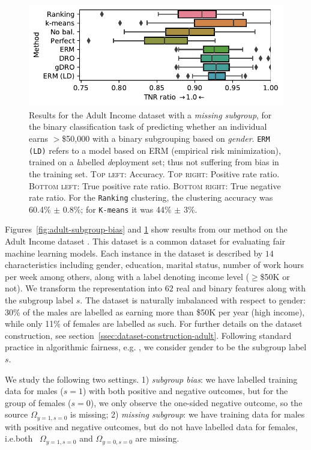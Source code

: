 \begin{figure}[p]
    \includegraphics[width=\columnwidth]{paper3/figures/adult_miss_s_tnrr.pdf}
    \caption{%
    Results for the Adult Income dataset with a \emph{missing subgroup},
    for the binary classification task of predicting whether an individual earns $>$\$50,000 with a binary subgrouping based on \emph{gender}.
    \texttt{ERM (LD)} refers to a model based on ERM (empirical risk minimization),
    trained on a \emph{l}abelled \emph{d}eployment set; thus not suffering from bias in the training set.
    \textsc{Top left}: Accuracy.
    \textsc{Top right}: Positive rate ratio.
    \textsc{Bottom left}: True positive rate ratio.
    \textsc{Bottom right}: True negative rate ratio.
    For the \texttt{Ranking} clustering, the clustering accuracy was 60.4\% $\pm$ 0.8\%;
    for \texttt{K-means} it was 44\% $\pm$ 3\%.
    }%
    \label{fig:adult-missing-subgroup}
\end{figure}
Figures~\ref{fig:adult-subgroup-bias} and \ref{fig:adult-missing-subgroup} show results from our method on the Adult Income dataset \cite{Dua:2017}.
This dataset is a common dataset for evaluating fair machine learning models. 
Each instance in the dataset is described by $14$ characteristics including gender, education, marital status, number of work hours per week among others, along with a label denoting income level ($\geq$\$50K or not). 
We transform the representation into $62$ real and binary features along with the subgroup label $s$. %
The dataset is naturally imbalanced with respect to gender: 30\% of the males are labelled as earning more than \$50K per year (high income), while only 11\% of females are labelled as such.
For further details on the dataset construction, see section~\ref{ssec:dataset-construction-adult}.
%
Following standard practice in algorithmic fairness, e.g. \citet{zemel2013learning}, we consider gender to be the subgroup label $s$.

We study the following two settings.
1) \emph{subgroup bias}: we have labelled training data for males ($s=1$) with both positive and negative outcomes, but for the group of females ($s=0$), we only observe the one-sided negative outcome, so the source $\Omega_{y=1,s=0}$ is missing;
2) \emph{missing subgroup}: we have training data for males with positive and negative outcomes, but do not have labelled data for females, i.e.both \ $\Omega_{y=1,s=0}$ and $\Omega_{y=0,s=0}$ are missing.

